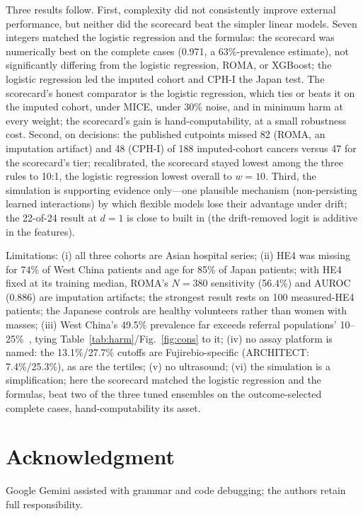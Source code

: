 \documentclass[conference]{IEEEtran}
\begin{document}
Three results follow. First, complexity did not consistently
improve external performance, but neither
did the scorecard beat the simpler linear models. Seven integers
matched the logistic regression and the formulas: the scorecard
was numerically best on the complete cases (0.971, a
63\%-prevalence estimate), not significantly differing
from the logistic regression, ROMA, or
XGBoost; the logistic regression led the imputed
cohort and CPH-I the Japan test.
The scorecard's honest comparator is the logistic
regression, which ties or beats it on the imputed cohort, under MICE,
under 30\% noise, and in minimum harm at every weight; the scorecard's gain is
hand-computability, at a small robustness cost.
Second, on decisions: the published cutpoints missed 82 (ROMA, an
imputation artifact) and
48 (CPH-I) of 188 imputed-cohort cancers versus 47
for the scorecard's tier; recalibrated, the
scorecard stayed lowest among the three rules to 10:1, the logistic
regression lowest overall to $w=10$. Third, the simulation is supporting evidence
only---one plausible mechanism (non-persisting learned interactions)
by which flexible models lose their advantage under drift; the
22-of-24 result at $d=1$ is close to built in (the drift-removed
logit is additive in the features).

Limitations: (i) all three cohorts are Asian hospital series; (ii)
HE4 was missing for 74\% of West China patients and age for 85\% of
Japan patients; with HE4 fixed at its training median, ROMA's
$N=380$ sensitivity (56.4\%) and AUROC (0.886) are imputation
artifacts; the strongest result rests on 100 measured-HE4 patients; the Japanese controls are healthy volunteers rather than
women with masses; (iii) West China's 49.5\% prevalence far exceeds referral
populations' 10--25\%~\cite{rolfsen2020}, tying
Table~\ref{tab:harm}/Fig.~\ref{fig:cons} to it; (iv) no assay platform
is named: the 13.1\%/27.7\% cutoffs are Fujirebio-specific
(ARCHITECT: 7.4\%/25.3\%), as are the tertiles;
(v) no ultrasound; (vi) the simulation is a simplification; here the
scorecard matched the logistic regression and the formulas, beat two
of the three tuned ensembles on the outcome-selected complete cases,
hand-computability its asset.

\section*{Acknowledgment}
Google Gemini assisted with grammar and code debugging; the
authors retain full responsibility.
\end{document}
